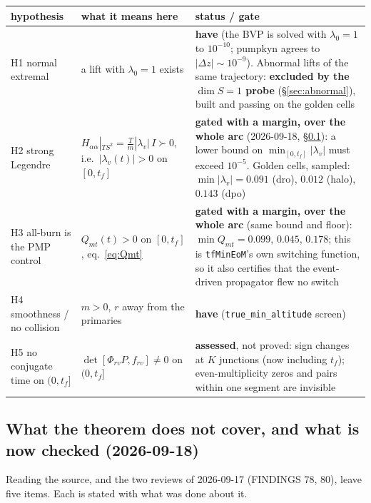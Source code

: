 \documentclass[11pt]{article}
\theoremstyle{definition}
\newcommand{\lv}{\lambda_v}
\newcommand{\tf}{t_f}
\begin{document}
\begin{center}\small
\begin{tabular}{@{}p{}p{}p{}@{}}
\toprule
hypothesis & what it means here & status / gate \\
\midrule
H1 normal extremal & a lift with $\lambda_0=1$ exists & \textbf{have} (the BVP is solved with $\lambda_0=1$ to $10^{-10}$; pumpkyn agrees to $|\Delta z|\sim10^{-9}$). Abnormal lifts of the same trajectory: \textbf{excluded by the $\dim S=1$ probe} (\S\ref{sec:abnormal}), built and passing on the golden cells \\
H2 strong Legendre & $H_{\alpha\alpha}|_{TS^2}=\tfrac{T}{m}|\lv|\,I\succ0$, i.e.\ $|\lv(t)|>0$ on $[0,\tf]$ & \textbf{gated with a margin, over the whole arc} (2026-09-18, \S\ref{sec:gaps}): a lower bound on $\min_{[0,\tf]}|\lv|$ must exceed $10^{-5}$. Golden cells, sampled: $\min|\lv|=0.091$ (dro), $0.012$ (halo), $0.143$ (dpo) \\
H3 all-burn is the PMP control & $Q_{mt}(t)>0$ on $[0,\tf]$, eq.~\eqref{eq:Qmt} & \textbf{gated with a margin, over the whole arc} (same bound and floor): $\min Q_{mt}=0.099$, $0.045$, $0.178$; this is \texttt{tfMinEoM}'s own switching function, so it also certifies that the event-driven propagator flew no switch \\
H4 smoothness / no collision & $m>0$, $r$ away from the primaries & \textbf{have} (\texttt{true\_min\_altitude} screen) \\
H5 no conjugate time on $(0,\tf]$ & $\det[\Phi_{rv}P,f_{rv}]\neq0$ on $(0,\tf]$ & \textbf{assessed}, not proved: sign changes at $K$ junctions (now including $\tf$); even-multiplicity zeros and pairs within one segment are invisible \\
\bottomrule
\end{tabular}
\end{center}

\subsection{What the theorem does not cover, and what is now checked (2026-09-18)}\label{sec:gaps}
Reading the source, and the two reviews of 2026-09-17 (FINDINGS 78, 80), leave
five items. Each is stated with what was done about it.
\end{document}
